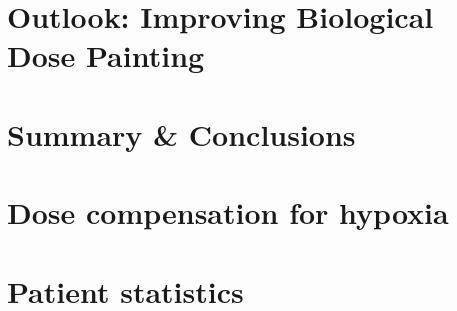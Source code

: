 \chapter{Outlook: Improving Biological Dose Painting}\label{chapter:6}


\chapter{Summary \& Conclusions}\label{chapter:X}

\newpage
\setcounter{page}{1}

\appendix
\chapter{Dose compensation for hypoxia}\label{appendix:a}
\chapter{Patient statistics}\label{appendix:b}



\cleardoublepage
{}
{}
\nocite{*}

\footnotesize{
 
}

\listoffigures
\listoftables

 
